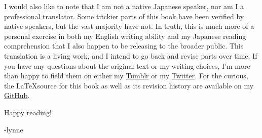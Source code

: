 I would also like to note that I am not a native Japanese speaker, nor am I a professional translator. Some trickier parts of this book have been verified by native speakers, but the vast majority have not. In truth, this is much more of a personal exercise in both my English writing ability and my Japanese reading comprehension that I also happen to be releasing to the broader public. This translation is a living work, and I intend to go back and revise parts over time. If you have any questions about the original text or my writing choices, I'm more than happy to field them on either my \href{https://plvpwaa.tumblr.com}{Tumblr} or my \href{https://twitter.com/plvpwaa}{Twitter}. For the curious, the \LaTeX \space source for this book as well as its revision history are available on my \href{https://github.com/Spirati/translation-octopath}{GitHub}. 

Happy reading!

-lynne